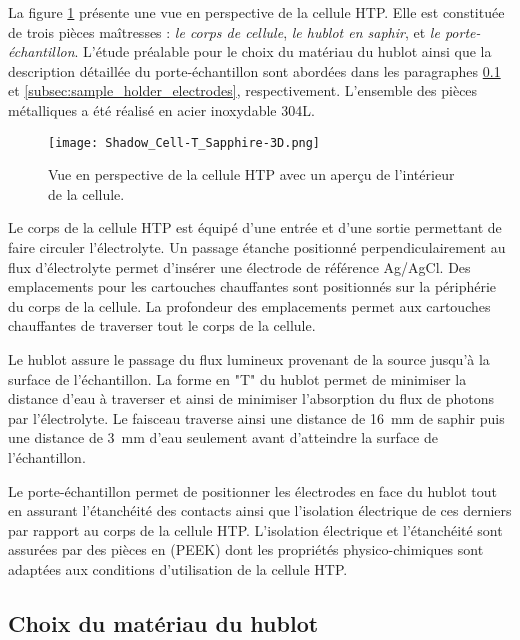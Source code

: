 \begin{refsection}
        La figure \ref{fig:3D_HT_cell} présente une vue en perspective de la cellule HTP.
        Elle est constituée de trois pièces maîtresses : \emph{le corps de cellule}, \emph{le hublot en saphir}, et 
        \emph{le porte-échantillon}. L'étude préalable pour le choix du matériau du hublot ainsi que la description détaillée du
        porte-échantillon sont abordées dans les paragraphes \ref{subsec:window_material} et
        \ref{subsec:sample_holder_electrodes}, respectivement.
        L'ensemble des pièces métalliques a été réalisé en acier inoxydable 304L. 

        \begin{figure}[H]
            \centering
            \texttt{[image: Shadow\_Cell-T\_Sapphire-3D.png]}
            \caption{Vue en perspective de la cellule HTP avec un aperçu de l’intérieur de la cellule.}
            \label{fig:3D_HT_cell}
        \end{figure}

        Le corps de la cellule HTP est équipé d’une entrée et d’une sortie permettant de faire circuler l’électrolyte.
        Un passage étanche positionné perpendiculairement au flux d’électrolyte permet d’insérer une électrode de
        référence Ag/AgCl. 
        Des emplacements pour les cartouches chauffantes sont positionnés sur la périphérie du corps de la cellule.
        La profondeur des emplacements permet aux cartouches chauffantes de traverser tout le corps de la cellule. 

        Le hublot assure le passage du flux lumineux provenant de la source jusqu’à la surface de
        l’échantillon. La forme en "T" du hublot permet de minimiser la distance d'eau à traverser et ainsi de minimiser
        l'absorption du flux de photons par l'électrolyte.
        Le faisceau traverse ainsi une distance de \SI{16}{\milli\meter} de saphir puis une distance de
        \SI{3}{\milli\meter} d'eau seulement avant d'atteindre la surface de l'échantillon. 

        Le porte-échantillon permet de positionner les électrodes en face du hublot tout en assurant 
        l’étanchéité des contacts ainsi que l’isolation électrique de ces derniers par rapport au corps de la cellule
        HTP.
        L’isolation électrique et l’étanchéité sont assurées par des pièces en (PEEK) dont 
        les propriétés physico-chimiques sont adaptées aux conditions d’utilisation de la cellule HTP.


     \subsection{Choix du matériau du hublot}\label{subsec:window_material}


\end{refsection}
